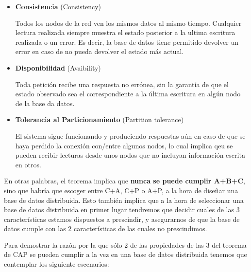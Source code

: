 \begin{itemize}
	\item \textbf{Consistencia} (Consistency)
	
	Todos los nodos de la red ven los mismos datos al mismo tiempo. Cualquier lectura realizada siempre muestra el estado posterior a la ultima escritura realizada o un error. Es decir, la base de datos tiene permitido devolver un error en caso de no pueda devolver el estado más actual.
	
	\item \textbf{Disponibilidad} (Avaibility)
	
	Toda petición recibe una respuesta no errónea, sin la garantía de que el estado observado sea el correspondiente a la última escritura en algún nodo de la base da datos.
	
	\item \textbf{Tolerancia al Particionamiento} (Partition tolerance)
	
	El sistema sigue funcionando y produciendo respuestas aún en caso de que se haya perdido la conexión con/entre algunos nodos, lo cual implica qeu se pueden recibir lecturas desde unos nodos que no incluyan información escrita en otros.
\end{itemize}

En otras palabras, el teorema implica que \textbf{nunca se puede cumplir A+B+C}, sino que habría que escoger entre C+A, C+P o A+P, a la hora de diseñar una base de datos distribuida. Esto también implica que a la hora de seleccionar una base de datos distribuida en primer lugar tendremos que decidir cuales de las 3 características estamos dispuestos a prescindir, y asegurarnos de que la base de datos cumple con las 2 características de las cuales no prescindimos.

Para demostrar la razón por la que sólo 2 de las propiedades de las 3 del teorema de CAP se pueden cumplir a la vez en una base de datos distribuida tenemos que contemplar los siguiente escenarios:

